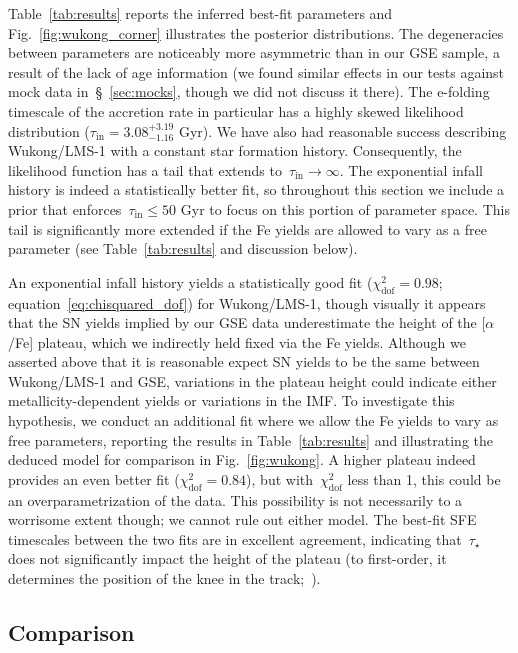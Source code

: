Table~\ref{tab:results} reports the inferred best-fit parameters and
Fig.~\ref{fig:wukong_corner} illustrates the posterior distributions.
The degeneracies between parameters are noticeably more asymmetric than in our
GSE sample, a result of the lack of age information (we found similar effects
in our tests against mock data in~\S~\ref{sec:mocks}, though we did not discuss
it there).
The e-folding timescale of the accretion rate in particular has a highly skewed
likelihood distribution ($\tau_\text{in} = 3.08^{+3.19}_{-1.16}$ Gyr).
We have also had reasonable success describing Wukong/LMS-1 with a constant
star formation history.
Consequently, the likelihood function has a tail that extends
to~$\tau_\text{in} \rightarrow \infty$.
The exponential infall history is indeed a statistically better fit, so
throughout this section we include a prior that
enforces~$\tau_\text{in} \leq 50$ Gyr to focus on this portion of parameter
space.
This tail is significantly more extended if the Fe yields are allowed to vary
as a free parameter (see Table~\ref{tab:results} and discussion below).
\par
An exponential infall history yields a statistically good fit
($\chi_\text{dof}^2 = 0.98$; equation~\ref{eq:chisquared_dof}) for Wukong/LMS-1,
though visually it appears that the SN yields implied by our GSE data
underestimate the height of the [$\alpha$/Fe] plateau, which we indirectly
held fixed via the Fe yields.
Although we asserted above that it is reasonable expect SN yields to be the
same between Wukong/LMS-1 and GSE, variations in the plateau height could
indicate either metallicity-dependent yields or variations in the IMF.
To investigate this hypothesis, we conduct an additional fit where we allow
the Fe yields to vary as free parameters, reporting the results in
Table~\ref{tab:results} and illustrating the deduced model for comparison in
Fig.~\ref{fig:wukong}.
A higher plateau indeed provides an even better fit
($\chi_\text{dof}^2 = 0.84$), but with~$\chi_\text{dof}^2$ less than 1, this
could be an overparametrization of the data.
This possibility is not necessarily to a worrisome extent though; we cannot
rule out either model.
The best-fit SFE timescales between the two fits are in excellent agreement,
indicating that~$\tau_\star$ does not significantly impact the height of the
plateau (to first-order, it determines the position of the knee in the
track;~\citealp{Weinberg2017b}).

\subsection{Comparison}
\label{sec:h3:comparison}

